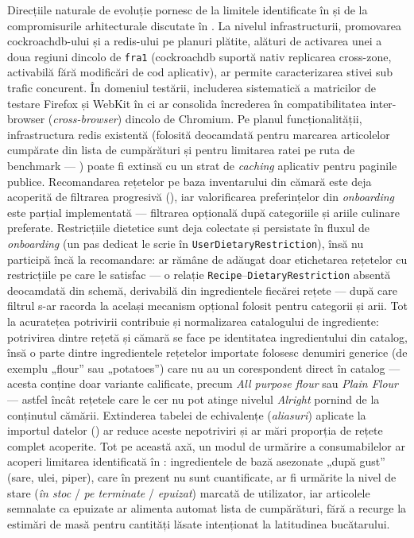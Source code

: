 Direcțiile naturale de evoluție pornesc de la limitele identificate în  și de la compromisurile arhitecturale discutate în .
La nivelul infrastructurii, promovarea \gls{cockroachdb}-ului și a \gls{redis}-ului pe planuri plătite, alături de activarea unei a doua regiuni dincolo de \texttt{fra1} (\gls{cockroachdb} suportă nativ replicarea cross-zone, activabilă fără modificări de cod aplicativ), ar permite caracterizarea stivei sub trafic concurent.
În domeniul testării, includerea sistematică a matricilor de testare Firefox și WebKit în \acrshort{ci} ar consolida încrederea în compatibilitatea inter-browser (\textit{cross-browser}) dincolo de Chromium.
Pe planul funcționalității, infrastructura \gls{redis} existentă (folosită deocamdată pentru marcarea articolelor cumpărate din lista de cumpărături și pentru limitarea ratei pe ruta de benchmark --- ) poate fi extinsă cu un strat de \textit{caching} aplicativ pentru paginile publice. Recomandarea rețetelor pe baza inventarului din cămară este deja acoperită de filtrarea progresivă (), iar valorificarea preferințelor din \textit{onboarding} este parțial implementată --- filtrarea opțională după categoriile și ariile culinare preferate. Restricțiile dietetice sunt deja colectate și persistate în fluxul de \textit{onboarding} (un pas dedicat le scrie în \texttt{UserDietaryRestriction}), însă nu participă încă la recomandare: ar rămâne de adăugat doar etichetarea rețetelor cu restricțiile pe care le satisfac --- o relație \texttt{Recipe}--\texttt{DietaryRestriction} absentă deocamdată din schemă, derivabilă din ingredientele fiecărei rețete --- după care filtrul s-ar racorda la același mecanism opțional folosit pentru categorii și arii.
Tot la acuratețea potrivirii contribuie și normalizarea catalogului de ingrediente: potrivirea dintre rețetă și cămară se face pe identitatea ingredientului din catalog, însă o parte dintre ingredientele rețetelor importate folosesc denumiri generice (de exemplu „flour” sau „potatoes”) care nu au un corespondent direct în catalog --- acesta conține doar variante calificate, precum \textit{All purpose flour} sau \textit{Plain Flour} --- astfel încât rețetele care le cer nu pot atinge nivelul \textit{Alright} pornind de la conținutul cămării. Extinderea tabelei de echivalențe (\textit{aliasuri}) aplicate la importul datelor () ar reduce aceste nepotriviri și ar mări proporția de rețete complet acoperite.
Tot pe această axă, un modul de urmărire a consumabilelor ar acoperi limitarea identificată în : ingredientele de bază asezonate „după gust” (sare, ulei, piper), care în prezent nu sunt cuantificate, ar fi urmărite la nivel de stare (\textit{în stoc} / \textit{pe terminate} / \textit{epuizat}) marcată de utilizator, iar articolele semnalate ca epuizate ar alimenta automat lista de cumpărături, fără a recurge la estimări de masă pentru cantități lăsate intenționat la latitudinea bucătarului.

